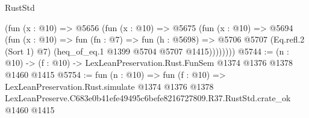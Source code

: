 \begin{lexlean}{RustStd}
\begin{coremodule}
          (fun (x : @10) =>
          @5656
            (fun (x : @10) =>
            @5675
              (fun (x : @10) =>
              @5694
                (fun (x : @10) =>
                fun (fn : @7) =>
                fun (h : @5698) =>
                @5706 @5707 (Eq.refl.{2} (Sort 1) @7) (heq_of_eq.{1} @1399 @5704 @5707 @1415))))))))
@5744 := (n : @10) -> (f : @10) -> LexLeanPreservation.Rust.FunSem @1374 @1376 @1378 @1460 @1415
@5754 := fun (n : @10) =>
  fun (f : @10) =>
  LexLeanPreservation.Rust.simulate
    @1374
    @1376
    @1378
    LexLeanPreserve.C683e0b41efe49495c6befe8216727809.R37.RustStd.crate_ok
    @1460
    @1415
\end{coremodule}
\end{lexlean}
